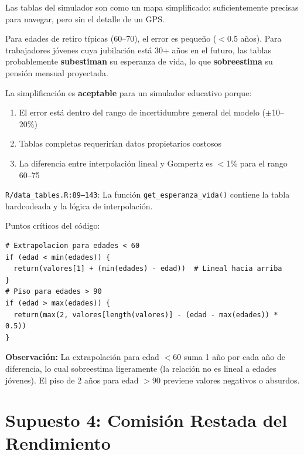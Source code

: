 \documentclass[11pt,a4paper]{report}
\begin{document}
\begin{tcolorbox}[colback=green!5!white, colframe=green!50!black, title=\textbf{Intuici\'on}]
Las tablas del simulador son como un mapa simplificado: suficientemente precisas para navegar, pero sin el detalle de un GPS.

Para edades de retiro t\'ipicas (60--70), el error es peque\~no ($<$0.5 a\~nos). Para trabajadores j\'ovenes cuya jubilaci\'on est\'a 30+ a\~nos en el futuro, las tablas probablemente \textbf{subestiman} su esperanza de vida, lo que \textbf{sobreestima} su pensi\'on mensual proyectada.

La simplificaci\'on es \textbf{aceptable} para un simulador educativo porque:
\begin{enumerate}
  \item El error est\'a dentro del rango de incertidumbre general del modelo ($\pm$10--20\%)
  \item Tablas completas requerir\'ian datos propietarios costosos
  \item La diferencia entre interpolaci\'on lineal y Gompertz es $<$1\% para el rango 60--75
\end{enumerate}
\end{tcolorbox}

\begin{tcolorbox}[colback=orange!5!white, colframe=orange!75!black, title=\textbf{Aplicaci\'on en C\'odigo}]
\texttt{R/data\_tables.R:89--143}: La funci\'on \texttt{get\_esperanza\_vida()} contiene la tabla hardcodeada y la l\'ogica de interpolaci\'on.

Puntos cr\'iticos del c\'odigo:
\begin{lstlisting}
# Extrapolacion para edades < 60
if (edad < min(edades)) {
  return(valores[1] + (min(edades) - edad))  # Lineal hacia arriba
}
# Piso para edades > 90
if (edad > max(edades)) {
  return(max(2, valores[length(valores)] - (edad - max(edades)) * 0.5))
}
\end{lstlisting}

\textbf{Observaci\'on:} La extrapolaci\'on para edad $< 60$ suma 1 a\~no por cada a\~no de diferencia, lo cual sobreestima ligeramente (la relaci\'on no es lineal a edades j\'ovenes). El piso de 2 a\~nos para edad $> 90$ previene valores negativos o absurdos.
\end{tcolorbox}


\section{Supuesto 4: Comisi\'on Restada del Rendimiento}
\end{document}
